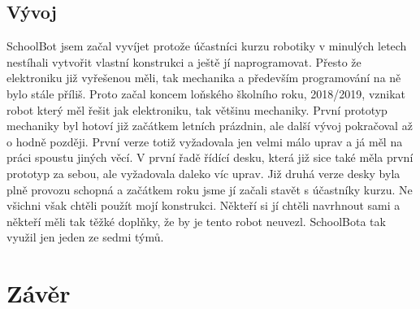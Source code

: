 \documentclass{template/socthesis}
\begin{document}
\section{Vývoj}

SchoolBot jsem začal vyvíjet protože účastníci kurzu robotiky v minulých letech nestíhali vytvořit vlastní konstrukci a ještě jí naprogramovat. Přesto že elektroniku již vyřešenou měli, tak mechanika a především programování na ně bylo stále příliš. Proto začal koncem loňského školního roku, 2018/2019, vznikat robot který měl řešit jak elektroniku, tak většinu mechaniky. 
První prototyp mechaniky byl hotoví již začátkem letních prázdnin, ale další vývoj pokračoval až o hodně později. První verze totiž vyžadovala jen velmi málo uprav a já měl na práci spoustu jiných věcí. V první řadě řídící desku, která již sice také měla první prototyp za sebou, ale vyžadovala daleko víc uprav. Již druhá verze desky byla plně provozu schopná a začátkem roku jsme jí začali stavět s účastníky kurzu. Ne všichni však chtěli použít mojí konstrukci. Někteří si jí chtěli navrhnout sami a někteří měli tak těžké doplňky, že by je tento robot neuvezl. SchoolBota tak využil jen jeden ze sedmi týmů.

\chapter*{Závěr}

\newpage

\listoffigures
{}

\listoftables
{}


\newpage
\end{document}
